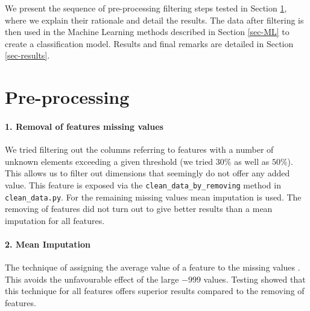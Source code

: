 \documentclass[fleqn,9 pt]{SelfArx} %
\affiliation{\textbf{Email (SCIPER):} \hspace{0.2cm} \textsuperscript{1} bruno.magalhaes@epfl.ch (212079) \hspace{0.2cm} \textsuperscript{2} marie.drieghe@epfl.ch (273688) \hspace{0.2cm} \textsuperscript{3} nicolas.casademont@epfl.ch (223485)}
\begin{document}
\begin{sloppypar} %

\flushbottom %
\maketitle %
\thispagestyle{empty} %
\small %

We present the sequence of pre-processing filtering steps tested in Section \ref{sec-pre-proc}, where we explain their rationale and detail the results. The data after filtering is then used in the Machine Learning methods described in Section \ref{sec-ML} to create a classification model. Results and final remarks are detailed in Section \ref{sec-results}.

\section{Pre-processing}
\label{sec-pre-proc}

\paragraph{1. Removal of features missing values} We tried filtering out the columns referring to features with a number of unknown elements exceeding a given threshold (we tried $30\%$ as well as $50\%$). This allows us to filter out dimensions that seemingly do not offer any added value. This feature is exposed via the \texttt{clean\_data\_by\_removing} method in \texttt{clean\_data.py}. For the remaining missing values mean imputation is used. The removing of features did not turn out to give better results than a mean imputation for all features.

\paragraph{2. Mean Imputation} The technique of assigning the average value of a feature to the missing values \cite{donders2006review}. This avoids the unfavourable effect of the large $-999$ values. Testing showed that this technique for all features offers superior results compared to the removing of features.


\end{sloppypar}
\end{document}
